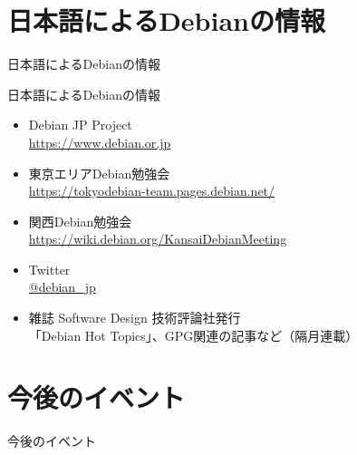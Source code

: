 \section{日本語によるDebianの情報}

\begin{frame}\begin{center}\Huge{日本語によるDebianの情報}\end{center}\end{frame}

\begin{frame}{日本語によるDebianの情報}
\begin{itemize}
  \item Debian JP Project \\
      \url{https://www.debian.or.jp}
  \item 東京エリアDebian勉強会\\
      \url{https://tokyodebian-team.pages.debian.net/}
  \item 関西Debian勉強会 \\
      \url{https://wiki.debian.org/KansaiDebianMeeting}
  \item Twitter \\
      \url{@debian_jp}
  \item  雑誌 Software Design 技術評論社発行 \\
    「Debian Hot Topics」、GPG関連の記事など（隔月連載）
\end{itemize}
\end{frame}


\section{今後のイベント}

\begin{frame}\begin{center}\Huge{今後のイベント}\end{center}\end{frame}

